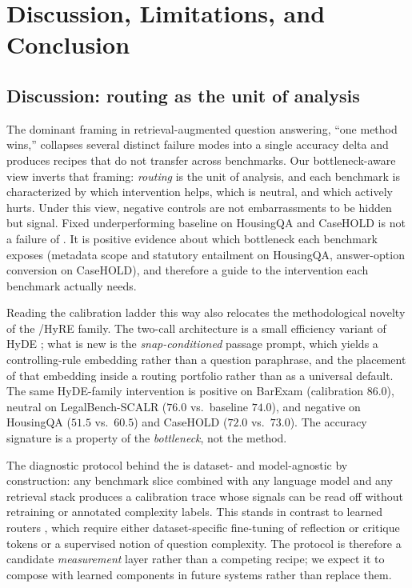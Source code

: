 \section{Discussion, Limitations, and Conclusion}\label{sec:conclusion}

\subsection{Discussion: routing as the unit of analysis}

The dominant framing in retrieval-augmented question answering, ``one method
wins,'' collapses several distinct failure modes into a single accuracy delta
and produces recipes that do not transfer across benchmarks. Our
bottleneck-aware view inverts that framing: \emph{routing} is the unit of
analysis, and each benchmark is characterized by which intervention helps,
which is neutral, and which actively hurts. Under this view, negative
controls are not embarrassments to be hidden but signal. Fixed
\hyre{} underperforming baseline on HousingQA and CaseHOLD is not
a failure of \hyre{}. It is positive evidence about which bottleneck each
benchmark exposes (metadata scope and statutory entailment on HousingQA,
answer-option conversion on CaseHOLD), and therefore a guide to the
intervention each benchmark actually needs.

Reading the calibration ladder this way also relocates the methodological
novelty of the \hyre{}/HyRE family. The two-call
architecture is a small efficiency variant of HyDE \citep{gao2023hyde}; what
is new is the \emph{snap-conditioned} passage prompt, which yields a
controlling-rule embedding rather than a question paraphrase, and the
placement of that embedding inside a routing portfolio rather than as a
universal default. The same HyDE-family intervention is positive on BarExam
(calibration \hyre{} $86.0$), neutral on LegalBench-SCALR ($76.0$
vs.\ baseline $74.0$), and negative on HousingQA ($51.5$ vs.\ $60.5$) and
CaseHOLD ($72.0$ vs.\ $73.0$). The accuracy signature is a property of the
\emph{bottleneck}, not the method.

The diagnostic protocol behind the \controller{} is dataset- and
model-agnostic by construction: any benchmark slice combined with any
language model and any retrieval stack produces a calibration trace whose
signals can be read off without retraining or annotated complexity
labels. This stands in contrast to learned routers
\citep{asai2024selfrag,jeong2024adaptive}, which require either
dataset-specific fine-tuning of reflection or critique tokens or a
supervised notion of question complexity. The protocol is therefore a
candidate \emph{measurement} layer rather than a competing recipe; we expect
it to compose with learned components in future systems rather than replace
them.

